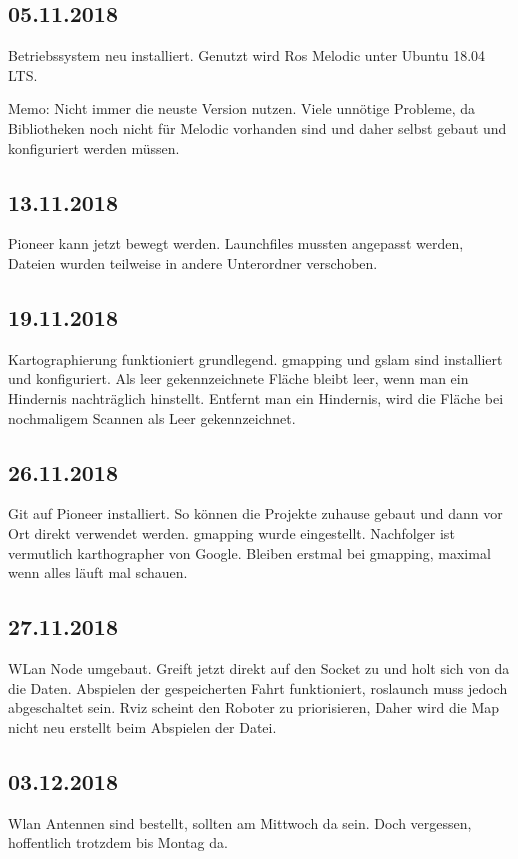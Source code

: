 \documentclass{scrartcl}%
\begin{document}
\subsection{05.11.2018}
Betriebssystem neu installiert. Genutzt wird Ros Melodic unter Ubuntu 18.04 LTS.

Memo: Nicht immer die neuste Version nutzen. Viele unnötige Probleme, da Bibliotheken noch nicht für Melodic vorhanden sind und daher selbst gebaut und konfiguriert werden müssen.

\subsection{13.11.2018}
Pioneer kann jetzt bewegt werden. Launchfiles mussten angepasst werden, Dateien wurden teilweise in andere Unterordner verschoben.

\subsection{19.11.2018}
Kartographierung funktioniert grundlegend. gmapping und gslam sind installiert und konfiguriert. Als leer gekennzeichnete Fläche bleibt leer, wenn man ein Hindernis nachträglich hinstellt. Entfernt man ein Hindernis, wird die Fläche bei nochmaligem Scannen als Leer gekennzeichnet.

\subsection{26.11.2018}
Git auf Pioneer installiert. So können die Projekte zuhause gebaut und dann vor Ort direkt verwendet werden. gmapping wurde eingestellt. Nachfolger ist vermutlich karthographer von Google. Bleiben erstmal bei gmapping, maximal wenn alles läuft mal schauen.

\subsection{27.11.2018}
WLan Node umgebaut. Greift jetzt direkt auf den Socket zu und holt sich von da die Daten. Abspielen der gespeicherten Fahrt funktioniert, roslaunch muss jedoch abgeschaltet sein. Rviz scheint den Roboter zu priorisieren, Daher wird die Map nicht neu erstellt beim Abspielen der Datei.

\subsection{03.12.2018}
Wlan Antennen sind bestellt, sollten am Mittwoch da sein. Doch vergessen, hoffentlich trotzdem bis Montag da.
\end{document}
